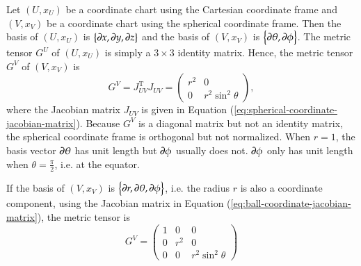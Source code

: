 \documentclass[11pt, a4paper]{book}
\begin{document}
\begin{Example}
  \label{exam:spherical-coordinate-metric-tensor}
  Let $(U,x_U)$ be a coordinate chart using the Cartesian coordinate frame and $(V,x_V)$
  be a coordinate chart using the spherical coordinate frame. Then the basis of $(U,x_U)$
  is $\left\{ \boldsymbol{\partial}x, \boldsymbol{\partial}y, \boldsymbol{\partial}z \right\}$ and the basis of
  $(V,x_V)$ is $\left\{ \boldsymbol{\partial}\theta, \boldsymbol{\partial}\phi \right\}$. The metric
  tensor $G^U$ of $(U,x_U)$ is simply a $3\times 3$ identity matrix. Hence, the metric
  tensor $G^V$ of $(V,x_V)$ is
  \begin{equation}
    \label{eq:spherical-coordinate-metric-tensor}
    G^V = J_{UV}^{\mathrm{T}} J_{UV} = \begin{pmatrix}
      r^2 & 0 \\
      0 & r^2\sin^2\theta
    \end{pmatrix},
  \end{equation}
  where the Jacobian matrix $J_{UV}$ is given in Equation
  (\ref{eq:spherical-coordinate-jacobian-matrix}). Because $G^V$ is a diagonal matrix but
  not an identity matrix, the spherical coordinate frame is orthogonal but not normalized.
  When $r=1$, the basis vector $\boldsymbol{\partial}\theta$ has unit length but
  $\boldsymbol{\partial}\phi$ usually does not. $\boldsymbol{\partial}\phi$ only has unit length when
  $\theta=\frac{\pi}{2}$, i.e. at the equator.
\end{Example}

\begin{Example}
  \label{exam:ball-coordinate-metric-tensor}
  If the basis of $(V,x_V)$ is
  $\left\{ \boldsymbol{\partial}r, \boldsymbol{\partial}\theta, \boldsymbol{\partial}\phi \right\}$, i.e. the
  radius $r$ is also a coordinate component, using the Jacobian matrix in Equation
  (\ref{eq:ball-coordinate-jacobian-matrix}), the metric tensor is
  \begin{equation}
    \label{eq:ball-coordinate-metric-tensor}
    G^V = \begin{pmatrix}
      1 & 0 & 0 \\
      0 & r^2 & 0 \\
      0 & 0 & r^2 \sin^2\theta
    \end{pmatrix}
  \end{equation}
\end{Example}
\end{document}
